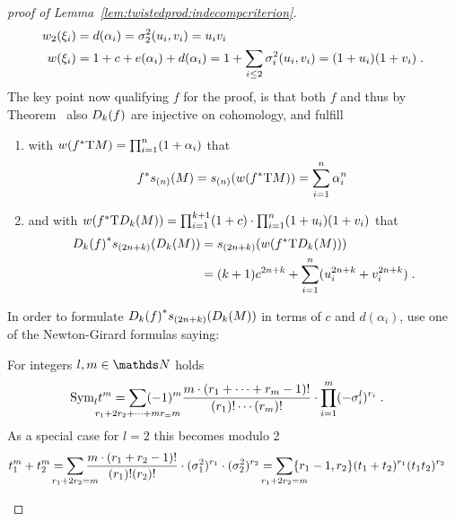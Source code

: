 \begin{proof}[proof of Lemma~\ref{lem:twistedprod:indecompcriterion}]
\begin{align*}
    {w_{2}}(\xi_i) &= d(\alpha_i)   = \sigma_{2}^{2}(u_i, v_i) = u_iv_i \\
    {w}(\xi_i)  &= 1+c+e(\alpha_i)+d(\alpha_i)
                 = 1+\sum_{i\leq2}\sigma_{i}^{2}(u_i,v_i) = (1+u_i)(1+v_i)
                 \;.
  \end{align*}
  The key point now qualifying $f$ for the proof, is that both $f$ and
  thus by
  Theorem~
  also $D_{k}({f})$ are injective on cohomology, and fulfill
  \begin{enumerate}
  \item with ${w}({f}^*\mathrm{T}M) = \prod_{i=1}^n (1+\alpha_i)$ that
    \begin{gather}\label{eq:lem:twistedprod:indecompcriterion:sM}
      {f}^* s_{(n)}(M)
      = s_{(n)}({w}({f}^*\mathrm{T}M))
      = \sum_{i=1}^n \alpha_i^n
      \;
    \end{gather}
  \item and with
    ${w}({f}^*\mathrm{T}D_{k}({M}))
    = \prod_{i=1}^{k+1}(1+c) \cdot \prod_{i=1}^n
    (1+u_i)(1+v_i)$
    that
    \begin{align}\notag
      {D_{k}({f})}^* s_{(2n+k)}(D_{k}({M}))
      &= s_{(2n+k)}({w}({f}^*\mathrm{T}D_{k}({M}))) \\
      \label{eq:lem:twistedprod:indecompcriterion:sDkM}
      &= (k+1)c^{2n+k} + \sum_{i=1}^n (u_i^{2n+k} + v_i^{2n+k})
        \;.
    \end{align}
  \end{enumerate}
  In order to formulate
  ${D_{k}({f})}^*s_{(2n+k)}(D_{k}({M}))$ 
  in terms of $c$ and $d(\alpha_i)$,
  use one of the Newton-Girard formulas saying:
  \begin{Lem}
    For integers $l, m\in\Nat$ holds
    \begin{align*}
      \symm{l} t^m
      &= \sum_{\mathclap{r_1+2r_2+\dotsb+mr_=m}}
        (-1)^m \frac{m\cdot(r_1+\dotsb+r_m-1)!}{(r_1)!\dotsm(r_m)!}
        \cdot \prod_{i=1}^m (-\el i l)^{r_i}
        \;.
    \end{align*}
    As a special case for $l=2$ this becomes modulo 2
    \begin{align*}
      t_1^m + t_2^m
      &= \sum_{\mathclap{r_1+2r_2=m}}
        \frac{m\cdot(r_1+r_2-1)!}{(r_1)!(r_2)!}
        \cdot (\el 1 2)^{r_1} \cdot (\el 2 2)^{r_2}
        = \sum_{\mathclap{r_1+2r_2=m}}
        \altbinom{r_1-1}{r_2} (t_1+t_2)^{r_1}(t_1t_2)^{r_2}
    \end{align*}

\end{Lem}
\end{proof}
